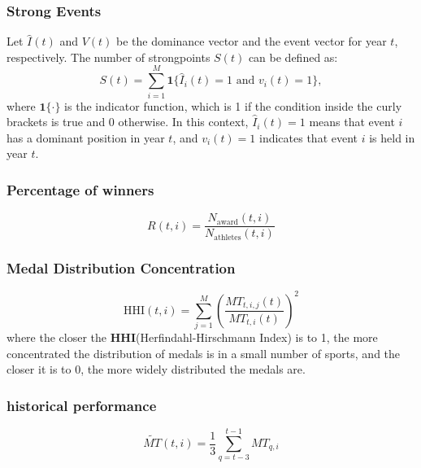 \documentclass{mcmthesis}
\begin{document}
	
	\subsubsection{Strong Events}
	
	Let \( \hat{I}(t) \) and \( V(t) \) be the dominance vector and the event vector for year \( t \), respectively. The number of strongpoints \( S(t) \) can be defined as:
	\[
	S(t) = \sum_{i=1}^{M} \mathbf{1}\{ \hat{I}_i(t) = 1 \text{ and } v_i(t) = 1 \},
	\]
	where \( \mathbf{1}\{ \cdot \} \) is the indicator function, which is 1 if the condition inside the curly brackets is true and 0 otherwise. 
	In this context, \( \hat{I}_i(t) = 1 \) means that event \( i \) has a dominant position in year \( t \), and \( v_i(t) = 1 \) indicates that event \( i \) is held in year \( t \).
	
	
	\subsubsection{Percentage of winners}
	\[R(t,i) = \frac{N_{\text{award}}(t,i)}{N_{\text{athletes}}(t,i)}\]
	
	\subsubsection{Medal Distribution Concentration}
\[
\text{HHI}(t,i) = \sum_{j=1}^{M} \left( \frac{MT_{t,i,j}(t)}{MT_{t,i}(t)} \right)^2
\]
where the closer the \textbf{HHI}(Herfindahl-Hirschmann Index)\cite{HHI2016} is to 1, the more concentrated the distribution of medals is in a small number of sports, and the closer it is to 0, the more widely distributed the medals are.

	\subsubsection{historical performance}
	
	\[
	\widetilde{MT}(t,i) = \frac{1}{3} \sum_{q=t-3}^{t-1} MT_{q,i}
	\]
	
	
\end{document}

